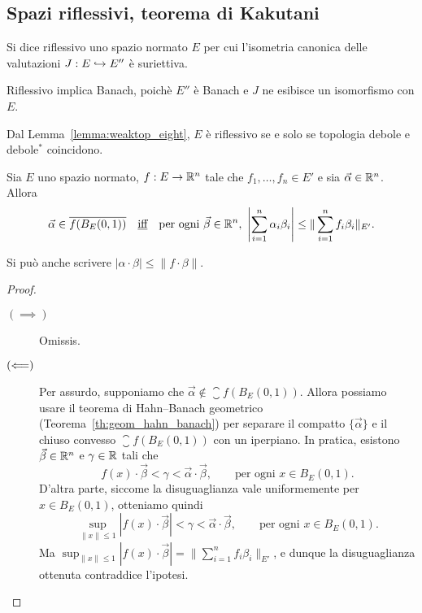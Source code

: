 \subsection{Spazi riflessivi, teorema di Kakutani}
\begin{definition}
	Si dice riflessivo uno spazio normato $E$ per cui l'isometria canonica delle valutazioni $J : E \hookrightarrow E''$ è suriettiva.
\end{definition}

\begin{remark}
	Riflessivo implica Banach, poichè $E''$ è Banach e $J$ ne esibisce un isomorfismo con $E$.
\end{remark}
\begin{remark}
	Dal Lemma~\ref{lemma:weaktop_eight}, $E$ è riflessivo se e solo se topologia debole e debole$^*$ coincidono.
\end{remark}

\begin{lemma}[Helly]
	Sia $E$ uno spazio normato, $f : E \to \mathbb{R}^n$ tale che $f_1, \ldots, f_n \in E'$ e sia $\vec \alpha \in \mathbb{R}^n$.
	Allora
	\begin{equation*}
		\vec \alpha \in \overline{f(B_E(0,1))} \quad\text{\underline{iff}}\quad \text{per ogni $\vec \beta \in \mathbb{R}^n$},\ \left| \sum_{i=1}^n \alpha_i \beta_i \right| \leq \| \sum_{i=1}^n f_i\beta_i \|_{E'}.
	\end{equation*}
\end{lemma}
\begin{remark}
	Si può anche scrivere $|\alpha \cdot \beta| \leq \|f \cdot \beta\|$.
\end{remark}
\begin{proof}
	\begin{description}
		\item[$(\implies)$] Omissis.
		\item[$(\Longleftarrow)$] Per assurdo, supponiamo che $\vec \alpha \notin \closure{f(B_E(0,1))}$. Allora possiamo usare il teorema di Hahn--Banach geometrico (Teorema~\ref{th:geom_hahn_banach}) per separare il compatto $\{\vec\alpha\}$ e il chiuso convesso $\closure{f(B_E(0,1))}$ con un iperpiano. In pratica, esistono $\vec\beta \in \mathbb{R}^n$ e $\gamma \in \mathbb{R}$ tali che
		\begin{equation*}
			f(x) \cdot \vec \beta < \gamma < \vec \alpha \cdot \vec \beta, \qquad \text{per ogni $x \in B_E(0,1)$}.
		\end{equation*}
		D'altra parte, siccome la disuguaglianza vale uniformemente per $x \in B_E(0,1)$, otteniamo quindi
		\begin{equation*}
			\sup_{\|x\| \leq 1} |f(x) \cdot \vec \beta| < \gamma < \vec \alpha \cdot \vec \beta, \qquad \text{per ogni $x \in B_E(0,1)$}.
		\end{equation*}
		Ma $\sup_{\|x\| \leq 1} |f(x) \cdot \vec \beta| = \|\sum_{i=1}^n f_i \beta_i\|_{E'}$, e dunque la disuguaglianza ottenuta contraddice l'ipotesi.
	\end{description}
\end{proof}

